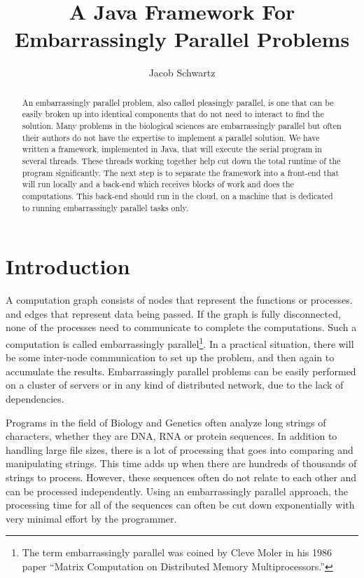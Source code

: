 \documentclass[12pt]{article}
\begin{document}
\title{A Java Framework For Embarrassingly Parallel Problems}
\author{Jacob Schwartz}
\maketitle

\begin{abstract}
An embarrassingly parallel problem, also called pleasingly parallel, is one that
can be easily broken up into identical components that do not need to interact
to find the solution. Many problems in the biological sciences are
embarrassingly parallel but often their authors do not have the expertise to
implement a parallel solution. We have written a framework, implemented in Java,
that will execute the serial program in several threads. These threads working
together help cut down the total runtime of the program significantly. The next
step is to separate the framework into a front-end that will run locally and a
back-end which receives blocks of work and does the computations. This back-end
should run in the cloud, on a machine that is dedicated to running
embarrassingly parallel tasks only.
\end{abstract}

\section{Introduction}

A computation graph consists of nodes that represent the functions or processes.
and edges that represent data being passed. If the graph is fully disconnected,
none of the processes need to communicate to complete the computations. Such a
computation is called embarrassingly parallel\footnote{The term embarrassingly
parallel was coined by Cleve Moler in his 1986 paper ``Matrix Computation on
Distributed Memory Multiprocessors.''}. In a practical situation, there will be
some inter-node communication to set up the problem, and then again to
accumulate the results.  Embarrassingly parallel problems can be easily
performed on a cluster of servers or in any kind of distributed network, due to
the lack of dependencies. 

Programs in the field of Biology and Genetics often analyze long strings of
characters, whether they are DNA, RNA or protein sequences. In addition to
handling large file sizes, there is a lot of processing that goes into comparing
and manipulating strings. This time adds up when there are hundreds of thousands
of strings to process. However, these sequences often do not relate to each
other and can be processed independently. Using an embarrassingly parallel
approach, the processing time for all of the sequences can often be cut down
exponentially with very minimal effort by the programmer.
\end{document}

